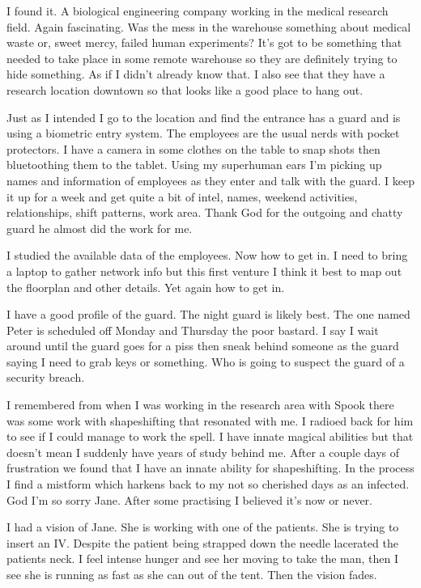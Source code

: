 I found it. A biological engineering company working in the medical research field. Again fascinating. Was the mess in the warehouse something about medical waste or, sweet mercy, failed human experiments? It's got to be something that needed to take place in some remote warehouse so they are definitely trying to hide something. As if I didn't already know that. I also see that they have a research location downtown so that looks like a good place to hang out.

Just as I intended I go to the location and find the entrance has a guard and is using a biometric entry system. The employees are the usual nerds with pocket protectors. I have a camera in some clothes on the table to snap shots then bluetoothing them to the tablet. Using my superhuman ears I'm picking up names and information of employees as they enter and talk with the guard. I keep it up for a week and get quite a bit of intel, names, weekend activities, relationships, shift patterns, work area. Thank God for the outgoing and chatty guard he almost did the work for me.

I studied the available data of the employees. Now how to get in. I need to bring a laptop to gather network info but this first venture I think it best to map out the floorplan and other details. Yet again how to get in.

I have a good profile of the guard. The night guard is likely best. The one named Peter is scheduled off Monday and Thursday the poor bastard. I say I wait around until the guard goes for a piss then sneak behind someone as the guard saying I need to grab keys or something. Who is going to suspect the guard of a security breach. 

I remembered from when I was working in the research area with Spook there was some work with shapeshifting that resonated with me. I radioed back for him to see if I could manage to work the spell. I have innate magical abilities but that doesn't mean I suddenly have years of study behind me. After a couple days of frustration we found that I have an innate ability for shapeshifting. In the process I find a mistform which harkens back to my not so cherished days as an infected. God I'm so sorry Jane. After some practising I believed it's now or never.

I had a vision of Jane. She is working with one of the patients. She is trying to insert an IV. Despite the patient being strapped down the needle lacerated the patients neck. I feel intense hunger and see her moving to take the man, then I see she is running as fast as she can out of the tent. Then the vision fades.

